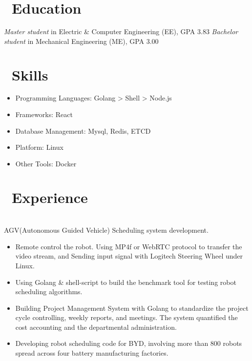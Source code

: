\documentclass[a4paper,10pt]{resume}
\begin{document}



\section{\faGraduationCap\ Education}
\textit{Master student} in Electric \& Computer Engineering (EE), GPA 3.83
\textit{Bachelor student} in Mechanical Engineering (ME), GPA 3.00

\section{\faCogs\ Skills}
\begin{itemize}[parsep=0.5ex]
  \item Programming Languages: Golang > Shell > Node.js
  \item Frameworks: React
  \item Database Management: Mysql, Redis, ETCD
  \item Platform: Linux
  \item Other Tools: Docker
\end{itemize}

\section{\faUsers\ Experience}
\role{Software engineer}
\\AGV(Autonomous Guided Vehicle) Scheduling system development.
\begin{itemize}
  \item Remote control the robot. Using MP4f or WebRTC protocol to transfer the video stream, and Sending input signal with Logitech Steering Wheel under Linux.
  \item Using Golang \& shell-script to build the benchmark tool for testing robot scheduling algorithms.
  \item Building Project Management System with Golang to standardize the project cycle controlling, weekly reports, and meetings. The system quantified the cost accounting and the departmental administration.
  \item Developing robot scheduling code for BYD, involving more than 800 robots spread across four battery manufacturing factories.
\end{itemize}
\end{document}
